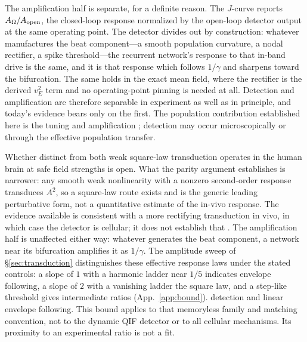 \documentclass[11pt,a4paper]{article}
\providecommand{\DIFaddtex}[1]{{\protect\color{blue} \sf #1}} %
\providecommand{\DIFdeltex}[1]{{\protect\color{red} \scriptsize #1}} %
\providecommand{\DIFaddbegin}{} %
\providecommand{\DIFaddend}{} %
\providecommand{\DIFdelbegin}{} %
\providecommand{\DIFdelend}{} %
\providecommand{\DIFadd}[1]{\texorpdfstring{\DIFaddtex{#1}}{#1}} %
\providecommand{\DIFdel}[1]{\texorpdfstring{\DIFdeltex{#1}}{}} %
\begin{document}
\DIFdel{The amplification half is separate, for a definite reason. The
$J$-curve reports $A_\Omega/A_{\rm open}$, the closed-loop response normalized by the
open-loop detector output at the same operating point. The detector divides out by
construction: whatever manufactures the beat component---a smooth population curvature, a
nodal rectifier, a spike threshold---the recurrent network's response to that in-band drive
is the same, and it is that response which follows $1/\gamma$ and sharpens toward the
bifurcation. The same holds in the exact mean field, where the rectifier is the derived
$v_E^2$ term and no operating-point pinning is needed at all. Detection and amplification
are therefore separable in experiment as well as in principle, and today's evidence bears
only on the first. The population contribution established here is the tuning
and amplification ; detection may occur microscopically or through the effective population
transfer.
}%

\DIFdel{Whether }\DIFdelend \DIFaddbegin \DIFadd{distinct from both weak
}\DIFaddend square-law \DIFdelbegin \DIFdel{transduction operates in the human brain at safe field strengths is
open. What the parity argument establishes is narrower: any smooth weak nonlinearity with a
nonzero second-order response transduces $A^2$, so a square-law route exists and is the
generic leading perturbative form, not a quantitative estimate of the in-vivo response.
The evidence available is consistent with a more rectifying transduction in vivo, in which
case the detector is cellular; it does not establish that . The amplification half is
unaffected either way: whatever generates the beat component,
a network near its
bifurcation amplifies it as $1/\gamma$. The amplitude sweep of \S\ref{sec:transduction}
distinguishes these effective response laws under the stated controls: a slope of $1$ with
a harmonic ladder near $1/5$ indicates envelope following, a slope of $2$ with a vanishing
ladder the square law, and a step-like threshold gives intermediate ratios
(App.~\ref{app:bound}).
}\DIFdelend \DIFaddbegin \DIFadd{detection and linear envelope following. This bound applies to that
memoryless family and matching convention, not to the dynamic QIF detector or to
all cellular mechanisms. Its proximity to an experimental ratio is not a fit.
}\DIFaddend
\end{document}
